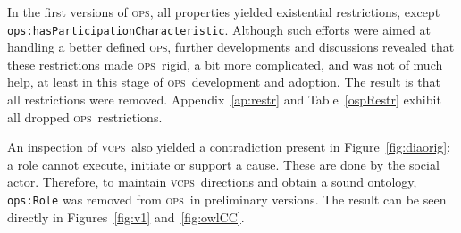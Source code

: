 \documentclass[10pt,letterpaper]{article}
\newcommand{\ops}{\textsc{ops}}
\newcommand{\vcps}{\textsc{vcps}}
\begin{document}
In the first versions of \ops, all properties yielded existential restrictions, except {\tt ops:hasParticipationCharacteristic}. Although such efforts were aimed at handling a better defined \ops, further developments and discussions revealed that these restrictions made \ops\ rigid, a bit more complicated, and was not of much help, at least in this stage of \ops\ development and adoption. The result is that all restrictions were removed. Appendix~\ref{ap:restr} and Table~\ref{ospRestr} exhibit all dropped \ops\ restrictions.

An inspection of \vcps\ also yielded a contradiction present in Figure~\ref{fig:diaorig}: a role cannot execute, initiate or support a cause. These are done by the social actor. Therefore, to maintain \vcps\ directions and obtain a sound ontology, {\tt ops:Role} was removed from \ops\ in preliminary versions. The result can be seen directly in Figures~\ref{fig:v1} and~\ref{fig:owlCC}.
\end{document}
